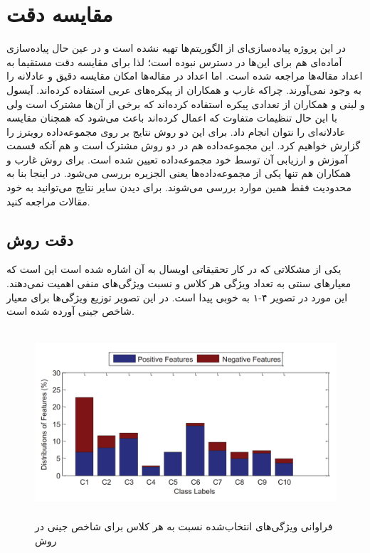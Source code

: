 \section{مقایسه دقت}
در این پروژه پیاده‌سازی‌ای از الگوریتم‌ها تهیه نشده است و در عین حال پیاده‌سازی آماده‌ای هم برای این‌ها در دسترس نبوده است؛ لذا برای مقایسه دقت مستقیما به اعداد مقاله‌ها مراجعه شده است. اما اعداد در مقاله‌ها امکان مقایسه دقیق و عادلانه را به وجود نمی‌آورند. چراکه غارب و همکاران از پیکره‌های عربی استفاده کرده‌اند. آیسول و لبنی و همکاران از تعدادی پیکره استفاده کرده‌اند که برخی از آن‌ها مشترک است ولی با این حال تنظیمات متفاوت که اعمال کرده‌اند باعث می‌شود که همچنان مقایسه عادلانه‌ای را نتوان انجام داد. برای این دو روش نتایج بر روی مجموعه‌داده رویترز را گزارش خواهیم کرد. این مجموعه‌داده هم در دو روش مشترک است و هم آنکه قسمت آموزش و ارزیابی آن توسط خود مجموعه‌داده تعیین شده است. برای روش غارب و همکاران هم تنها یکی از مجموعه‌داده‌ها یعنی الجزیره بررسی می‌شود. در اینجا بنا به محدودیت فقط همین موارد بررسی می‌شوند. برای دیدن سایر نتایج می‌توانید به خود مقالات مراجعه کنید.

\subsection{دقت روش }
یکی از مشکلاتی که در کار تحقیقاتی اویسال به آن اشاره شده است این است که معیار‌های سنتی به تعداد ویژگی هر کلاس و نسبت ویژگی‌های منفی اهمیت نمی‌دهند. این مورد در تصویر ۴-۱ به خوبی پیدا است. در این تصویر توزیع ویژگی‌ها برای معیار شاخص جینی آورده شده است.

\begin{figure}[!h]
\begin{center}
\includegraphics[height=7cm]{IGFSS1.png}
\end{center}
\caption{فراوانی ویژگی‌های انتخاب‌شده نسبت به هر کلاس برای شاخص جینی در روش  \cite{uysal2016improved} }
\end{figure}


